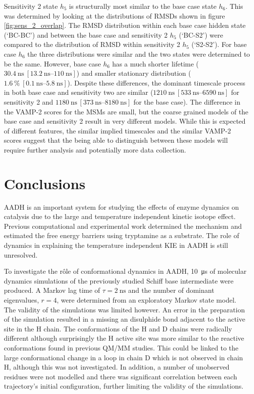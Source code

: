 Sensitivity 2 state $h_{5}$ is structurally most similar to the base case state $h_{6}$. This was determined by looking at the distributions of RMSDs shown in figure \ref{fig:sens_2_overlap}. The RMSD distribution within each base case hidden state (`BC-BC') and between the base case and sensitivity 2 $h_{5}$ (`BC-S2') were compared to the distribution of RMSD within sensitivity 2 $h_{5}$ (`S2-S2'). For base case $h_{6}$ the three distributions were similar and the two states were determined to be the same.  However, base case $h_{6}$ has a much shorter lifetime ($\SI{30.4}{\nano\second}\ [\SIrange[range-phrase=\text{--}]{13.2}{110}{\nano\second}]$) and smaller stationary distribution ($\SI{1.6}{\percent}\ [\SIrange[range-phrase=\text{--}]{0.1}{5.8}{\nano\second}]$). Despite these differences, the dominant timescale process in both base case and sensitivity two are similar ($\SI{1210}{\nano\second}\ [\SIrange[range-phrase=\text{--}]{533}{6590}{\nano\second}]$ for sensitivity 2 and  $\SI{1180}{\nano\second}\ [\SIrange[range-phrase=\text{--}]{373}{8180}{\nano\second}]$ for the base case). The difference in the VAMP-2 scores for the MSMs are small, but the coarse grained models of the base case and sensitivity 2 result in very different models. While this is expected of different features, the similar implied timescales  and the similar VAMP-2 scores suggest that the being able to distinguish between these models will require further analysis and potentially more data collection. 


\section{Conclusions}\label{sec:aadh_conclusions}
AADH is an important system for studying the effects of enzyme dynamics on catalysis due to the large and temperature independent kinetic isotope effect. Previous computational and experimental work determined the mechanism and estimated the free energy barriers using tryptamine as a substrate. The role of dynamics in explaining the temperature independent KIE in AADH is still unresolved. 

To investigate the r\^ole of conformational dynamics in AADH, \SI{10}{\micro\second} of molecular dynamics simulations of the previously studied Schiff base intermediate were produced. A Markov lag time of $\tau=\SI{2}{\nano\second}$ and the number of dominant eigenvalues, $r=4$, were determined from an exploratory Markov state model. The validity of the simulations was limited however. An error in the preparation of the simulation resulted in a missing an disulphide bond adjacent to the active site in the H chain. The conformations of the H and D chains were radically different although surprisingly the H active site was more similar to the reactive conformations found in previous QM/MM studies. This could be linked to the large conformational change in a loop in chain D which is not observed in chain H, although this was not investigated. In addition, a number of unobserved residues were not modelled and there was significant correlation between each trajectory's initial configuration, further limiting the validity of the simulations. 

